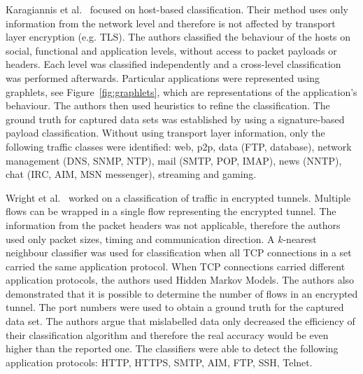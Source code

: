 Karagiannis et al.~\cite{Karagiannis-2005-BLINC} focused on host-based classification. Their method uses only information from the network level and therefore is not affected by transport layer encryption (e.g. TLS). The authors classified the behaviour of the hosts on social, functional and application levels, without access to packet payloads or headers. Each level was classified independently and a cross-level classification was performed afterwards. Particular applications were represented using graphlets, see Figure~\ref{fig:graphlets}, which are representations of the application’s behaviour. The authors then used heuristics to refine the classification. The ground truth for captured data sets was established by using a signature-based payload classification. Without using transport layer information, only the following traffic classes were identified: web, p2p, data (FTP, database), network management (DNS, SNMP, NTP), mail (SMTP, POP, IMAP), news (NNTP), chat (IRC, AIM, MSN messenger), streaming and gaming.

Wright et al.~\cite{Wright-2006-Inferring} worked on a classification of traffic in encrypted tunnels. Multiple flows can be wrapped in a single flow representing the encrypted tunnel. The information from the packet headers was not applicable, therefore the authors used only packet sizes, timing and communication direction. A $k$-nearest neighbour classifier was used for classification when all TCP connections in a set carried the same application protocol. When TCP connections carried different application protocols, the authors used Hidden Markov Models. The authors also demonstrated that it is possible to determine the number of flows in an encrypted tunnel. The port numbers were used to obtain a ground truth for the captured data set. The authors argue that mislabelled data only decreased the efficiency of their classification algorithm and therefore the real accuracy would be even higher than the reported one. The classifiers were able to detect the following application protocols: HTTP, HTTPS, SMTP, AIM, FTP, SSH, Telnet.

